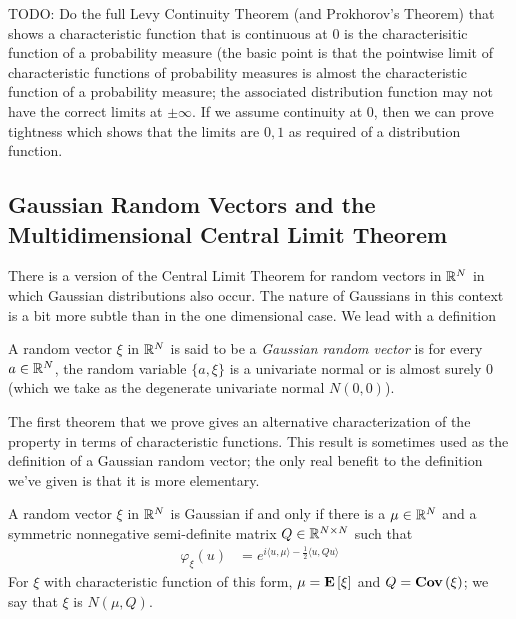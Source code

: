 TODO: Do the full Levy Continuity Theorem (and Prokhorov's Theorem) that shows a characteristic
function that is continuous at $0$ is the characterisitic function of
a probability measure (the basic point is that the pointwise limit of
characteristic functions of probability measures is almost the
characteristic function of a probability measure; the associated
distribution function may not have the correct limits at $\pm
\infty$.  If we assume continuity at $0$, then we can prove tightness
which shows that the limits are $0,1$ as required of a distribution
function.

\subsection{Gaussian Random Vectors and the Multidimensional Central
  Limit Theorem}
There is a version of the Central Limit Theorem for random vectors in
$\mathbb{R}^N$ in which Gaussian distributions also occur.  The nature of
Gaussians in this context is a bit more subtle than in the one
dimensional case.  We lead with a definition
\begin{defn}A random vector $\xi$ in $\mathbb{R}^N$ is said to be a \emph{Gaussian random
  vector} is for every $a \in \mathbb{R}^N$, the random variable $\lbrace
  a,\xi \rbrace$ is a univariate normal or is almost surely 0 (which
  we take as the degenerate univariate normal $N(0,0)$).
\end{defn}
The first theorem that we prove gives an alternative characterization
of the property in terms of characteristic functions.  This result is
sometimes used as the definition of a Gaussian random vector; the only
real benefit to the definition we've given is that it is more
elementary.
\begin{thm}\label{GaussianVectorCharacteristicFunction}A random vector
  $\xi$ in $\mathbb{R}^N$ is Gaussian if and only if there is a $\mu \in
  \mathbb{R}^N$ and a symmetric nonnegative semi-definite matrix $Q \in
  \mathbb{R}^{N\times N}$ such that 
\begin{align*}
\varphi_\xi(u) &= e^{i\langle u, \mu\rangle - \frac{1}{2}\langle u, Qu
\rangle}
\end{align*}
For $\xi$ with characteristic function of this form, $\mu =
\textbf{E}\left[\xi\right]$ and $Q = \textbf{Cov} \left (\xi \right )$; we say that $\xi$ is
$N(\mu, Q)$.
\end{thm}
